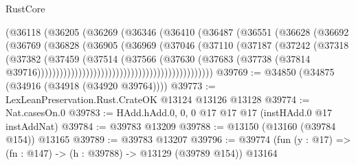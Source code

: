 \begin{lexlean}{RustCore}
\begin{coremodule}
                                              (@36118
                                                (@36205
                                                  (@36269
                                                    (@36346
                                                      (@36410
                                                        (@36487
                                                          (@36551
                                                            (@36628
                                                              (@36692
                                                                (@36769
                                                                  (@36828
                                                                    (@36905
                                                                      (@36969
                                                                        (@37046
                                                                          (@37110
                                                                            (@37187
                                                                              (@37242
                                                                                (@37318
                                                                                  (@37382
                                                                                    (@37459
                                                                                      (@37514
                                                                                        (@37566
                                                                                          (@37630
                                                                                            (@37683
                                                                                              (@37738
                                                                                                (@37814
                                                                                                  @39716)))))))))))))))))))))))))))))))))))))))))))))))
@39769 := @34850 (@34875 (@34916 (@34918 (@34920 @39764))))
@39773 := LexLeanPreservation.Rust.CrateOK @13124 @13126 @13128
@39774 := Nat.casesOn.{0}
@39783 := HAdd.hAdd.{0, 0, 0} @17 @17 @17 (instHAdd.{0} @17 instAddNat)
@39784 := @39783 @13209
@39788 := @13150 (@13160 (@39784 @154)) @13165
@39789 := @39783 @13207
@39796 := @39774 (fun (y : @17) => (fn : @147) -> (h : @39788) -> @13129 (@39789 @154)) @13164

\end{coremodule}
\end{lexlean}
